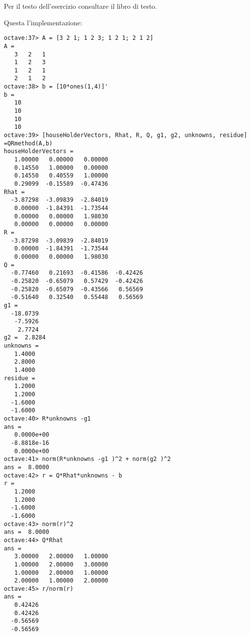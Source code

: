 \begin{exercise}[3.31]
Per il testo dell'esercizio consultare il libro di testo.
\end{exercise}
Questa l'implementazione:
\begin{lstlisting}
octave:37> A = [3 2 1; 1 2 3; 1 2 1; 2 1 2]
A =
   3   2   1
   1   2   3
   1   2   1
   2   1   2
octave:38> b = [10*ones(1,4)]'
b =
   10
   10
   10
   10
octave:39> [houseHolderVectors, Rhat, R, Q, g1, g2, unknowns, residue] =QRmethod(A,b) 
houseHolderVectors =
   1.00000   0.00000   0.00000
   0.14550   1.00000   0.00000
   0.14550   0.40559   1.00000
   0.29099  -0.15589  -0.47436
Rhat =
  -3.87298  -3.09839  -2.84019
   0.00000  -1.84391  -1.73544
   0.00000   0.00000   1.98030
   0.00000   0.00000   0.00000
R =
  -3.87298  -3.09839  -2.84019
   0.00000  -1.84391  -1.73544
   0.00000   0.00000   1.98030
Q =
  -0.77460   0.21693  -0.41586  -0.42426
  -0.25820  -0.65079   0.57429  -0.42426
  -0.25820  -0.65079  -0.43566   0.56569
  -0.51640   0.32540   0.55448   0.56569
g1 =
  -18.0739
   -7.5926
    2.7724
g2 =  2.8284
unknowns =
   1.4000
   2.8000
   1.4000
residue =
   1.2000
   1.2000
  -1.6000
  -1.6000
octave:40> R*unknowns -g1 
ans =
   0.0000e+00
  -8.8818e-16
   0.0000e+00
octave:41> norm(R*unknowns -g1 )^2 + norm(g2 )^2
ans =  8.0000
octave:42> r = Q*Rhat*unknowns - b
r =
   1.2000
   1.2000
  -1.6000
  -1.6000
octave:43> norm(r)^2
ans =  8.0000
octave:44> Q*Rhat
ans =
   3.00000   2.00000   1.00000
   1.00000   2.00000   3.00000
   1.00000   2.00000   1.00000
   2.00000   1.00000   2.00000
octave:45> r/norm(r)
ans =
   0.42426
   0.42426
  -0.56569
  -0.56569
\end{lstlisting}
 

